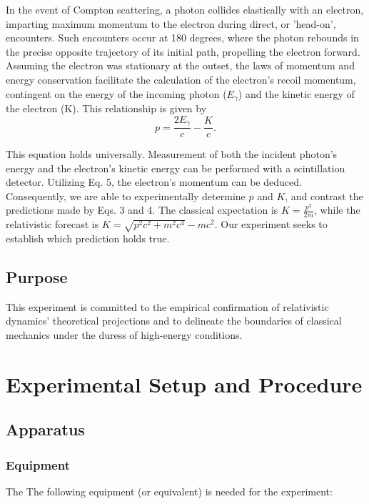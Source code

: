 \documentclass[12pt]{article}
\begin{document}
                    In the event of Compton scattering, a photon collides elastically with an electron, imparting maximum momentum to the electron during direct, or 'head-on', encounters. Such encounters occur at 180 degrees, where the photon rebounds in the precise opposite trajectory of its initial path, propelling the electron forward. Assuming the electron was stationary at the outset, the laws of momentum and energy conservation facilitate the calculation of the electron's recoil momentum, contingent on the energy of the incoming photon (\( E_\gamma \)) and the kinetic energy of the electron (K). This relationship is given by
                    \begin{equation}
                    p = \frac{2E_\gamma}{c} - \frac{K}{c}.
                    \end{equation}

                    This equation holds universally. Measurement of both the incident photon's energy and the electron's kinetic energy can be performed with a scintillation detector. Utilizing Eq. 5, the electron's momentum can be deduced. Consequently, we are able to experimentally determine \( p \) and \( K \), and contrast the predictions made by Eqs. 3 and 4. The classical expectation is \( K = \frac{p^2}{2m} \), while the relativistic forecast is \( K = \sqrt{ p^2c^2 + m^2c^4 } - mc^2 \). Our experiment seeks to establish which prediction holds true.

    \subsection{Purpose}
            This experiment is committed to the empirical confirmation of relativistic dynamics' theoretical projections and to delineate the boundaries of classical mechanics under the duress of high-energy conditions.


\section{Experimental Setup and Procedure}
        \subsection{Apparatus}
                \subsubsection{Equipment}
                The The following equipment (or equivalent) is needed for the experiment:
\end{document}
